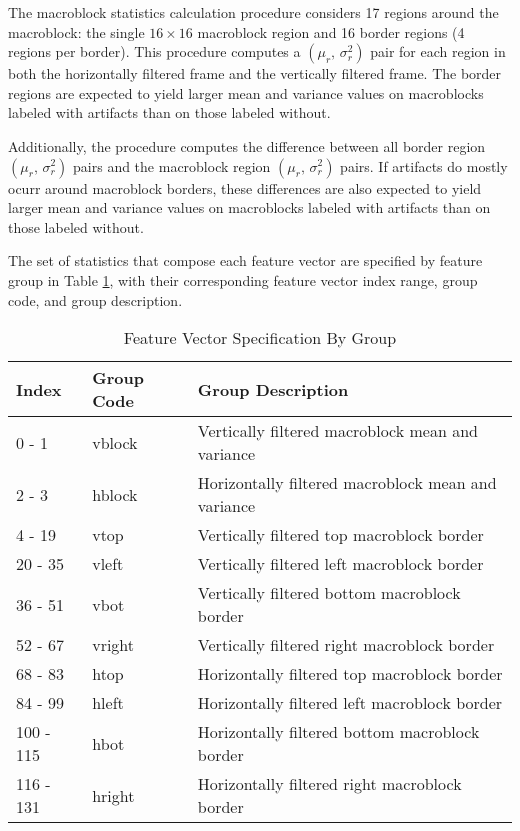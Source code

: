 The macroblock statistics calculation procedure considers 17 regions around the macroblock: the single $16\times16$ macroblock region and 16 border regions (4 regions per border). This procedure computes a $(\mu_r,\,\sigma^2_r)$ pair for each region in both the horizontally filtered frame and the vertically filtered frame. The border regions are expected to yield larger mean and variance values on macroblocks labeled with artifacts than on those labeled without.

Additionally, the procedure computes the difference between all border region $(\mu_r,\,\sigma^2_r)$ pairs and the macroblock region $(\mu_r,\,\sigma^2_r)$ pairs. If artifacts do mostly ocurr around macroblock borders, these differences are also expected to yield larger mean and variance values on macroblocks labeled with artifacts than on those labeled without.

The set of statistics that compose each feature vector are specified by feature group in Table \ref{tab:feature_vector_spec}, with their corresponding feature vector index range, group code, and group description.

\begin{table}[htbp]
  \caption{Feature Vector Specification By Group}
  \label{tab:feature_vector_spec}
  \centering
  \begin{tabular}{lll}
  \hline
  \textbf{Index} & \textbf{Group Code} & \textbf{Group Description} \\
  \hline
  0 - 1 & vblock & Vertically filtered macroblock mean and variance \\
  2 - 3 & hblock & Horizontally filtered macroblock mean and variance \\
  4 - 19 & vtop & Vertically filtered top macroblock border \\
  20 - 35 & vleft & Vertically filtered left macroblock border \\
  36 - 51 & vbot & Vertically filtered bottom macroblock border \\
  52 - 67 & vright & Vertically filtered right macroblock border \\
  68 - 83 & htop & Horizontally filtered top macroblock border \\
  84 - 99 & hleft & Horizontally filtered left macroblock border \\
  100 - 115 & hbot & Horizontally filtered bottom macroblock border \\
  116 - 131 & hright & Horizontally filtered right macroblock border \\
  \hline
  \end{tabular}
\end{table}

